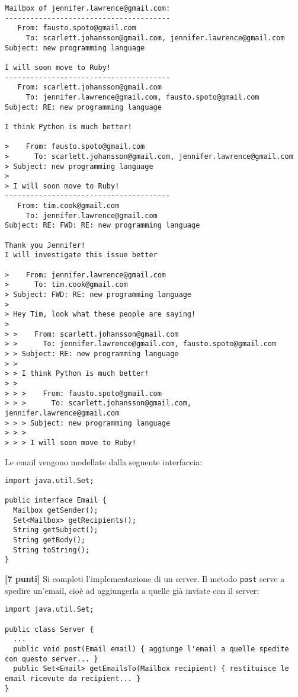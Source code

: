 \documentclass{article}[10pt]
\newcounter{esnu}
\newenvironment{esercizio}{\medskip \noindent {\bf Esercizio\addtocounter{esnu}{1} \arabic{esnu}}}{}
\begin{document}
{\scriptsize\begin{verbatim}
Mailbox of jennifer.lawrence@gmail.com:
---------------------------------------
   From: fausto.spoto@gmail.com
     To: scarlett.johansson@gmail.com, jennifer.lawrence@gmail.com
Subject: new programming language

I will soon move to Ruby!
---------------------------------------
   From: scarlett.johansson@gmail.com
     To: jennifer.lawrence@gmail.com, fausto.spoto@gmail.com
Subject: RE: new programming language

I think Python is much better!

>    From: fausto.spoto@gmail.com
>      To: scarlett.johansson@gmail.com, jennifer.lawrence@gmail.com
> Subject: new programming language
> 
> I will soon move to Ruby!
---------------------------------------
   From: tim.cook@gmail.com
     To: jennifer.lawrence@gmail.com
Subject: RE: FWD: RE: new programming language

Thank you Jennifer!
I will investigate this issue better

>    From: jennifer.lawrence@gmail.com
>      To: tim.cook@gmail.com
> Subject: FWD: RE: new programming language
> 
> Hey Tim, look what these people are saying!
> 
> >    From: scarlett.johansson@gmail.com
> >      To: jennifer.lawrence@gmail.com, fausto.spoto@gmail.com
> > Subject: RE: new programming language
> > 
> > I think Python is much better!
> > 
> > >    From: fausto.spoto@gmail.com
> > >      To: scarlett.johansson@gmail.com, jennifer.lawrence@gmail.com
> > > Subject: new programming language
> > > 
> > > I will soon move to Ruby!
\end{verbatim}}

Le email vengono modellate dalla seguente interfaccia:

{\small\begin{verbatim}
import java.util.Set;

public interface Email {
  Mailbox getSender();
  Set<Mailbox> getRecipients();
  String getSubject();
  String getBody();
  String toString();
}
\end{verbatim}}

\begin{esercizio}
\textbf{[7 punti]}
Si completi l'implementazione di un server. Il metodo
\texttt{post} serve a spedire un'email, cio\`e ad aggiungerla a quelle gi\`a
inviate con il server:

{\small\begin{verbatim}
import java.util.Set;

public class Server {
  ...
  public void post(Email email) { aggiunge l'email a quelle spedite con questo server... }
  public Set<Email> getEmailsTo(Mailbox recipient) { restituisce le email ricevute da recipient... }
}
\end{verbatim}}
\end{esercizio}
\end{document}

